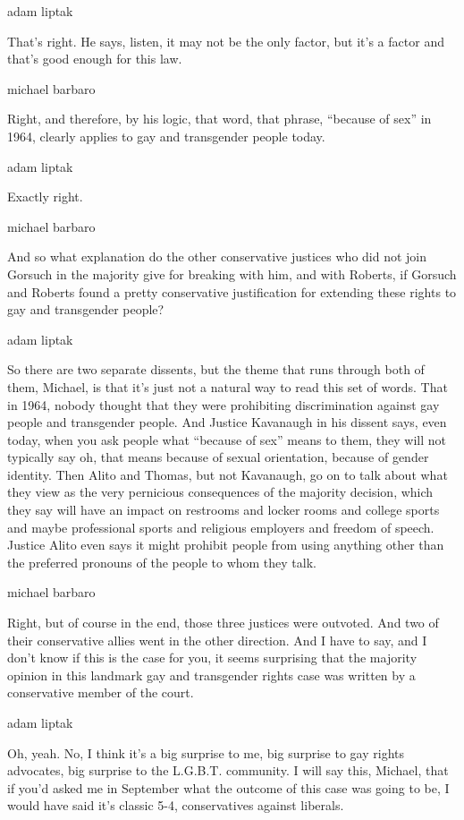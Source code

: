 adam liptak

That's right. He says, listen, it may not be the only factor, but it's a
factor and that's good enough for this law.

michael barbaro

Right, and therefore, by his logic, that word, that phrase, ``because of
sex'' in 1964, clearly applies to gay and transgender people today.

adam liptak

Exactly right.

michael barbaro

And so what explanation do the other conservative justices who did not
join Gorsuch in the majority give for breaking with him, and with
Roberts, if Gorsuch and Roberts found a pretty conservative
justification for extending these rights to gay and transgender people?

adam liptak

So there are two separate dissents, but the theme that runs through both
of them, Michael, is that it's just not a natural way to read this set
of words. That in 1964, nobody thought that they were prohibiting
discrimination against gay people and transgender people. And Justice
Kavanaugh in his dissent says, even today, when you ask people what
``because of sex'' means to them, they will not typically say oh, that
means because of sexual orientation, because of gender identity. Then
Alito and Thomas, but not Kavanaugh, go on to talk about what they view
as the very pernicious consequences of the majority decision, which they
say will have an impact on restrooms and locker rooms and college sports
and maybe professional sports and religious employers and freedom of
speech. Justice Alito even says it might prohibit people from using
anything other than the preferred pronouns of the people to whom they
talk.

michael barbaro

Right, but of course in the end, those three justices were outvoted. And
two of their conservative allies went in the other direction. And I have
to say, and I don't know if this is the case for you, it seems
surprising that the majority opinion in this landmark gay and
transgender rights case was written by a conservative member of the
court.

adam liptak

Oh, yeah. No, I think it's a big surprise to me, big surprise to gay
rights advocates, big surprise to the L.G.B.T. community. I will say
this, Michael, that if you'd asked me in September what the outcome of
this case was going to be, I would have said it's classic 5-4,
conservatives against liberals.

